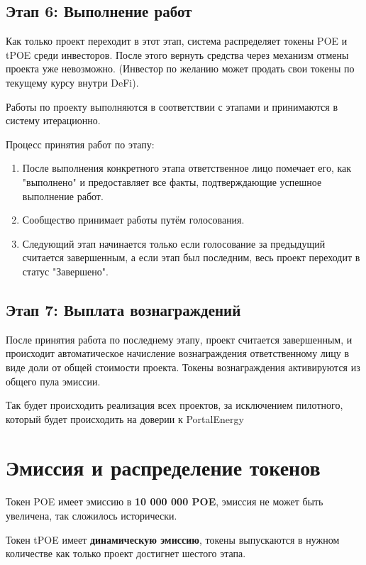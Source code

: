 \documentclass[a4paper,12pt]{report}
\begin{document}
\subsection{Этап 6: Выполнение работ}
	Как только проект переходит в этот этап, система распределяет токены POE и tPOE среди инвесторов. После этого вернуть средства через механизм отмены проекта уже невозможно. (Инвестор по желанию может продать свои токены по текущему курсу внутри DeFi). 

	Работы по проекту выполняются в соответствии с этапами и принимаются в систему итерационно. 
	
	Процесс принятия работ по этапу:
	\begin{enumerate}
		\item После выполнения конкретного этапа ответственное лицо помечает его, как "выполнено" и предоставляет все факты, подтверждающие успешное выполнение работ.
	    \item Сообщество принимает работы путём голосования.
	    \item Следующий этап начинается только если голосование за предыдущий считается завершенным, а если этап был последним, весь проект переходит в статус "Завершено".
	\end{enumerate}

\subsection{Этап 7: Выплата вознаграждений}
	После принятия работа по последнему этапу, проект считается завершенным, и происходит автоматическое начисление вознаграждения ответственному лицу в виде доли от общей стоимости проекта. Токены вознаграждения активируются из общего пула эмиссии. 



Так будет происходить реализация всех проектов, за исключением пилотного, который будет происходить на доверии к PortalEnergy 




\section{Эмиссия и распределение токенов}

Токен POE имеет эмиссию в \textbf{10 000 000 POE}, эмиссия не может быть увеличена, так сложилось исторически.
 
Токен tPOE имеет \textbf{динамическую эмиссию}, токены выпускаются в нужном количестве как только проект достигнет шестого этапа.
\end{document}
